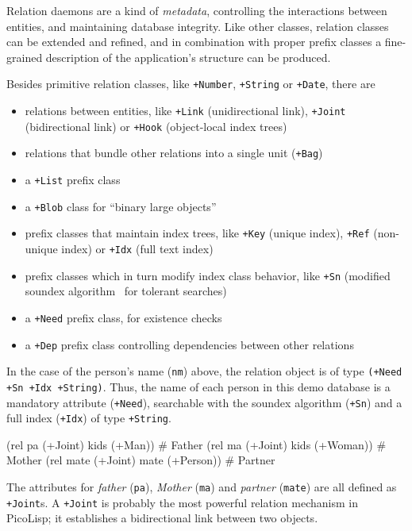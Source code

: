 Relation daemons are a kind of \emph{metadata}, controlling the interactions
between entities, and maintaining database integrity. Like other
classes, relation classes can be extended and refined, and in
combination with proper prefix classes a fine-grained description of the
application's structure can be produced.

Besides primitive relation classes, like \texttt{+Number}, \texttt{+String} or
\texttt{+Date}, there are

\begin{itemize}
\item relations between entities, like \texttt{+Link} (unidirectional link),
   \texttt{+Joint} (bidirectional link) or \texttt{+Hook} (object-local index trees)
\item relations that bundle other relations into a single unit (\texttt{+Bag})
\item a \texttt{+List} prefix class
\item a \texttt{+Blob} class for ``binary large objects''
\item prefix classes that maintain index trees, like \texttt{+Key} (unique index),
   \texttt{+Ref} (non-unique index) or \texttt{+Idx} (full text index)
\item prefix classes which in turn modify index class behavior, like \texttt{+Sn}
   (modified soundex algorithm~\cite{knuth73} for tolerant
   searches)
\item a \texttt{+Need} prefix class, for existence checks
\item a \texttt{+Dep} prefix class controlling dependencies between other
   relations
\end{itemize}

In the case of the person's name (\texttt{nm}) above, the relation object is of
type \texttt{(+Need +Sn +Idx +String)}. Thus, the name of each person in this
demo database is a mandatory attribute (\texttt{+Need}), searchable with the
soundex algorithm (\texttt{+Sn}) and a full index (\texttt{+Idx}) of type \texttt{+String}.


\begin{wideverbatim}
(rel pa (+Joint) kids (+Man))          # Father
(rel ma (+Joint) kids (+Woman))        # Mother
(rel mate (+Joint) mate (+Person))     # Partner
\end{wideverbatim}

The attributes for \emph{father} (\texttt{pa}), \emph{Mother}
(\texttt{ma}) and \emph{partner} (\texttt{mate}) are all defined as
\texttt{+Joint}s. A \texttt{+Joint} is probably the most powerful
relation mechanism in PicoLisp; it establishes a bidirectional link
between two objects.

